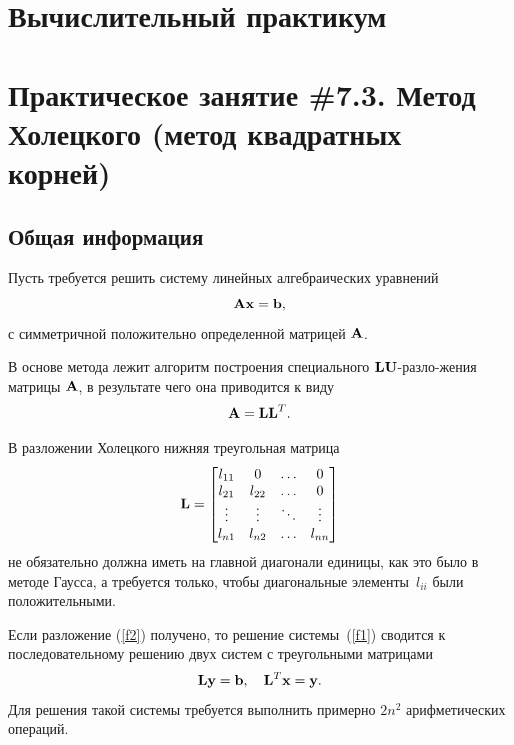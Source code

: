\documentclass[12pt]{article}
\begin{document}
    \begin{flushright}
    \end{flushright}
     \begin{flushright}
    \end{flushright}
    \section*{Вычислительный практикум}
    \section*{Практическое занятие \#7.3. Метод Холецкого (метод квадратных корней)}

    \subsection*{Общая информация}

    Пусть требуется решить систему линейных алгебраических уравнений
    \begin{equation}
        \bold{A}\bold{x}=\bold{b},\label{f1}
    \end{equation}
    с симметричной положительно определенной матрицей $\bold{A}$.

    В основе метода лежит алгоритм построения специального $\bold{LU}$-разло-\linebreak жения матрицы $\bold{A}$, в результате чего она приводится к виду
    \begin{equation}
        \bold{A}=\bold{LL}^{T}.\label{f2}
    \end{equation}

    В разложении Холецкого нижняя треугольная матрица
    \begin{equation}
        \bold{L}=
        \begin{bmatrix}
            l_{11} & 0 & \ldots & 0 \\
            l_{21} & l_{22} & \ldots & 0 \\
            \vdots & \vdots & \ddots & \vdots \\
            l_{n1} & l_{n2} & \ldots & l_{nn}
        \end{bmatrix}
    \end{equation}
    не обязательно должна иметь на главной диагонали единицы, как это было в методе Гаусса, а требуется только, чтобы диагональные элементы~$l_{ii}$ были положительными.

    Если разложение (\ref{f2}) получено, то решение системы~(\ref{f1}) сводится к последовательному решению двух систем с треугольными матрицами
    \begin{equation}
        \bold{L}\bold{y}=\bold{b},\quad \bold{L}^{T}\bold{x}=\bold{y}.\label{f4}
    \end{equation}
    Для решения такой системы требуется выполнить примерно $2n^2$ арифметических операций.
\end{document}
